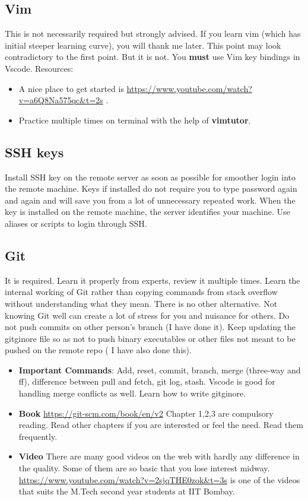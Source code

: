 \documentclass{article}
\begin{document}
\subsection{Vim}
This is not necessarily required but strongly advised. If you learn vim (which has initial steeper learning curve), you will thank me later.
This point may look contradictory to the first point. But it is not. You \textbf{must} use Vim key bindings in Vscode.
Resources:
\begin{itemize}
    \item A nice place to get started is \url{https://www.youtube.com/watch?v=a6Q8Na575qc&t=2s} .
    \item Practice multiple times on terminal with the help of \textbf{vimtutor}.
\end{itemize}
\subsection{SSH keys}

Install SSH key on the remote server as soon as possible for smoother login into the remote machine. Keys if installed do not require you to type password again and again and will save you from a lot of unnecessary repeated work. When the key is installed on the remote machine, the server identifies your machine. Use aliases or scripts to login through SSH.

\subsection{Git}
It is required. Learn it properly from experts, review it multiple times. Learn the internal working of Git rather than copying commands from stack overflow without understanding what they mean. There is no other alternative. 
Not knowing Git well can create a lot of stress for you and nuisance for others. Do not push commits on other person's branch (I have done it). Keep updating the gitginore file so as not to push binary executables or other files not meant to be pushed on the remote repo ( I have also done this).
\begin{itemize}
    \item \textbf{Important Commands}: Add, reset, commit, branch, merge (three-way and ff), difference between pull and fetch, git log, stash. Vscode is good for handling merge conflicts as well. Learn how to write gitginore. 
    \item \textbf{Book} \url{https://git-scm.com/book/en/v2} Chapter 1,2,3 are compulsory reading. 
    Read other chapters if you are interested or feel the need. Read them frequently.
    \item \textbf{Video} There are many good videos on the web with hardly any difference in the quality. Some of them are so basic that you lose interest midway. \url{https://www.youtube.com/watch?v=2sjqTHE0zok&t=3s} is one of the videos that suits the M.Tech second year students at IIT Bombay.
\end{itemize}
\end{document}
